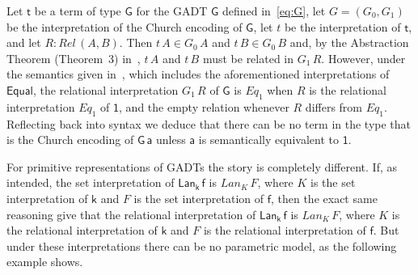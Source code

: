 \documentclass[acmsmall,screen,review,anonymous]{acmart}
\theoremstyle{definition}
\begin{document}
\begin{example}\label{ex:CE-par}
Let $\mathsf{t}$ be a term of type $\mathsf{G}$ for the GADT
$\mathsf{G}$ defined in~\eqref{eq:G}, let $G = (G_0,G_1)$ be the
interpretation of the Church encoding of $\mathsf{G}$, let $t$ be the
interpretation of $\mathsf{t}$, and let $R :
\mathit{Rel}\,(A,B)$. Then $t\, A \in G_0\,A$ and $t\,B \in G_0\,B$
and, by the Abstraction Theorem (Theorem~3) in~\cite{atk12}, $t\,A$
and $t\,B$ must be related in $G_1\,R$. However, under the semantics
given in~\cite{atk12}, {\color{blue} which includes the aforementioned
  interpretations of $\mathsf{Equal}$}, the relational interpretation
$G_1\,R$ of $\mathsf{G}$ is {\color{blue} $\mathit{Eq}_1$ when $R$ is
  the relational interpretation $\mathit{Eq}_1$ of $\mathsf{1}$, and
  the empty relation whenever $R$ differs from
  $\mathit{Eq}_1$}. Reflecting back into syntax we deduce that there
can be no term in the type that is the Church encoding of
$\mathsf{G\,a}$ unless $\mathsf{a}$ is semantically equivalent to
$\mathsf{1}$.
\end{example}

For primitive representations of GADTs the story is completely
different. If, as intended, the set interpretation of
$\mathsf{Lan_k\,f}$ is $\mathit{Lan}_K\,F$, where $K$ is the set
interpretation of $\mathsf{k}$ and $F$ is the set interpretation of
$\mathsf{f}$, then the exact same reasoning give that the relational
interpretation of $\mathsf{Lan_k\,f}$ is $\mathit{Lan}_K\,F$, where
$K$ is the relational interpretation of $\mathsf{k}$ and $F$ is the
relational interpretation of $\mathsf{f}$. But under these
interpretations there can be no parametric model, as the following
example shows.
\end{document}
